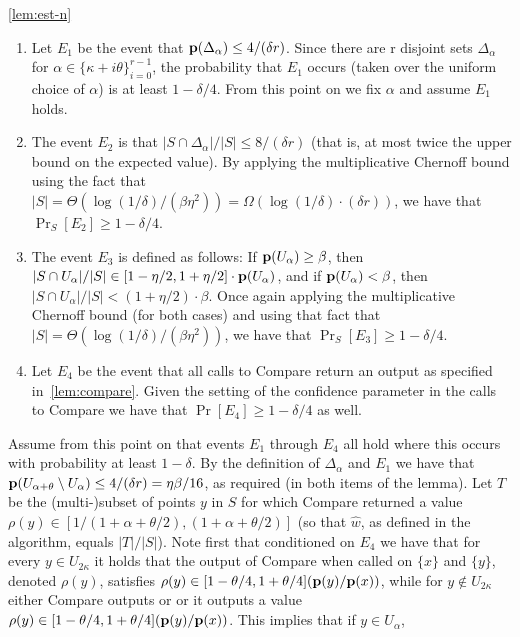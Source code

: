 \begin{proofof}{\cref{lem:est-n}}
\begin{enumerate}
\item Let $E_1$ be the event that $\mathbf{p}(\Delta_{\alpha}) \leq 4/(\delta r)$.
Since there are r disjoint sets $\Delta_\alpha$
for \mbox{$\alpha \in \{\kappa+ i\theta \}_{i=0}^{r -1}$,}
the probability that $E_1$ occurs (taken over the uniform choice of $\alpha$)
is at least $1-\delta/4$.
From this point on we fix $\alpha$ and assume $E_1$ holds.
\item The event $E_2$ is that
$|S\cap \Delta_{\alpha}|/|S| \leq 8/(\delta r)$
(that is, at most
twice the upper bound on the expected value).
By applying the  multiplicative Chernoff bound
using the fact that
\mbox{$|S| = \Theta(\log(1/\delta)/(\beta\eta^2)) =
   \Omega(\log(1/\delta) \cdot (\delta r))$,}
we have that $\Pr_S[E_2] \geq 1-\delta/4$.
\item The event $E_3$ is defined as follows:
If $\mathbf{p}(U_{\alpha}) \geq \beta$,
then
$|S\cap U_{\alpha}|/|S| \in
        [1-\eta/2,1+\eta/2]\cdot\mathbf{p}(U_{\alpha})$,
and if
$\mathbf{p}(U_{\alpha}) < \beta$,
then $|S\cap U_{\alpha}|/|S| < (1+\eta/2)\cdot\beta$.
Once again applying the multiplicative Chernoff bound (for both cases)
and using that fact that $|S| = \Theta(\log(1/\delta)/(\beta\eta^2))$,
we have that $\Pr_S[E_3]\geq 1-\delta/4$.
\item Let $E_4$ be the event that all calls to {\sc Compare} return
an output as specified in~\cref{lem:compare}. Given the setting
of the confidence parameter in the calls to {\sc Compare} we have that
$\Pr[E_4] \geq 1-\delta/4$ as well.
\end{enumerate}
Assume from this point on that events $E_1$ through $E_4$ all hold where
this occurs with probability at least $1-\delta$.
By the definition of $\Delta_\alpha$ and  $E_1$ we have that
$\mathbf{p}(U_{\alpha+\theta}\setminus U_\alpha)
       \leq 4/(\delta r) = \eta\beta/16$,
as required (in both items of the lemma).
Let $T$ be the (multi-)subset of points $y$ in $S$ for which
{\sc Compare} returned a value
$\rho(y) \in [1/(1+\alpha+\theta/2),(1+\alpha+\theta/2)]$
(so that $\hat{w}$, as defined in the algorithm, equals
$|T|/|S|$).
Note first  that conditioned on $E_4$ we have that for every
\mbox{$y \in U_{2\kappa}$} it holds that the output of {\sc Compare}
when called on $\{x\}$ and $\{y\}$,
denoted $\rho(y)$, satisfies
$\rho(y) \in [1-\theta/4,1+\theta/4](\mathbf{p}(y)/\mathbf{p}(x))$,
while for $y \notin U_{2\kappa}$ either {\sc Compare}
outputs \high or \low or it outputs a value
$\rho(y) \in [1-\theta/4,1+\theta/4](\mathbf{p}(y)/\mathbf{p}(x))$.
This implies that if $y \in U_{\alpha}$,

\end{proofof}
